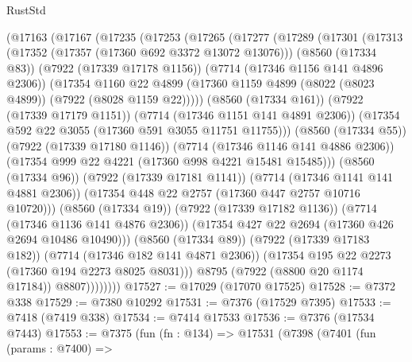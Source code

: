 \begin{lexlean}{RustStd}
\begin{coremodule}
              (@17163
                (@17167
                  (@17235
                    (@17253
                      (@17265
                        (@17277
                          (@17289
                            (@17301
                              (@17313
                                (@17352 (@17357 (@17360 @692 @3372 @13072 @13076)))
                                (@8560 (@17334 @83))
                                (@7922 (@17339 @17178 @1156))
                                (@7714 (@17346 @1156 @141 @4896 @2306))
                                (@17354
                                  @1160
                                  @22
                                  @4899
                                  (@17360
                                    @1159
                                    @4899
                                    (@8022 (@8023 @4899))
                                    (@7922 (@8028 @1159 @22)))))
                              (@8560 (@17334 @161))
                              (@7922 (@17339 @17179 @1151))
                              (@7714 (@17346 @1151 @141 @4891 @2306))
                              (@17354 @592 @22 @3055 (@17360 @591 @3055 @11751 @11755)))
                            (@8560 (@17334 @55))
                            (@7922 (@17339 @17180 @1146))
                            (@7714 (@17346 @1146 @141 @4886 @2306))
                            (@17354 @999 @22 @4221 (@17360 @998 @4221 @15481 @15485)))
                          (@8560 (@17334 @96))
                          (@7922 (@17339 @17181 @1141))
                          (@7714 (@17346 @1141 @141 @4881 @2306))
                          (@17354 @448 @22 @2757 (@17360 @447 @2757 @10716 @10720)))
                        (@8560 (@17334 @19))
                        (@7922 (@17339 @17182 @1136))
                        (@7714 (@17346 @1136 @141 @4876 @2306))
                        (@17354 @427 @22 @2694 (@17360 @426 @2694 @10486 @10490)))
                      (@8560 (@17334 @89))
                      (@7922 (@17339 @17183 @182))
                      (@7714 (@17346 @182 @141 @4871 @2306))
                      (@17354 @195 @22 @2273 (@17360 @194 @2273 @8025 @8031)))
                    @8795
                    (@7922 (@8800 @20 @1174 @17184))
                    @8807))))))))
@17527 := @17029 (@17070 @17525)
@17528 := @7372 @338
@17529 := @7380 @10292
@17531 := @7376 (@17529 @7395)
@17533 := @7418 (@7419 @338)
@17534 := @7414 @17533
@17536 := @7376 (@17534 @7443)
@17553 := @7375
    (fun (fn : @134) =>
    @17531
      (@7398
        (@7401
          (fun (params : @7400) =>

\end{coremodule}
\end{lexlean}
